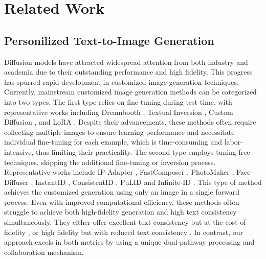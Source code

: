 \section{Related Work}

\subsection{Personilized Text-to-Image Generation} Diffusion models \cite{rombach2022high,nichol2021glide,podell2023sdxl,peebles2023scalable} have attracted widespread attention from both industry and academia due to their outstanding performance and high fidelity. This progress has spurred rapid development in customized image generation techniques. Currently, mainstream customized image generation methods can be categorized into two types. The first type relies on fine-tuning during test-time, with representative works including Dreambooth \cite{ruiz2023dreambooth}, Textual Inversion \cite{gal2022image}, Custom Diffusion \cite{kumari2023multi}, and LoRA \cite{hu2021lora}. Despite their advancements, these methods often require collecting multiple images to ensure learning performance and necessitate individual fine-tuning for each example, which is time-consuming and labor-intensive, thus limiting their practicality. The second type employs tuning-free techniques, skipping the additional fine-tuning or inversion process. Representative works include IP-Adapter \cite{ye2023ip}, FastComposer \cite{xiao2023fastcomposer}, PhotoMaker \cite{li2024photomaker}, Face-Diffuser \cite{wang2024high}, InstantID \cite{wang2024instantid}, ConsistentID  \cite{huang2024consistentid}, PuLID \cite{guo2024pulid} and Infinite-ID \cite{wu2024infinite}. This type of method achieves the customized generation using only an image in a single forward process. Even with improved computational efficiency, these methods often struggle to achieve both high-fidelity generation and high text consistency simultaneously. They either offer excellent text consistency but at the cost of fidelity \cite{li2024photomaker}, or high fidelity but with reduced text consistency \cite{huang2024consistentid,wang2024instantid,ye2023ip}. In contrast, our approach excels in both metrics by using a unique dual-pathway processing and collaboration mechanism.



